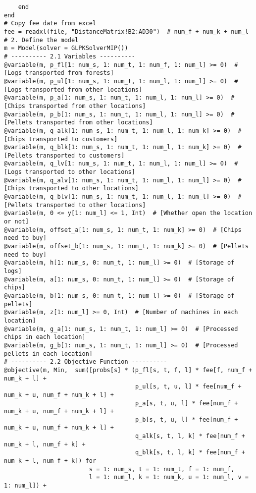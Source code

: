 \documentclass[fleqn,10pt]{wlscirep}
\begin{document}
\begin{lstlisting}
    end
end
# Copy fee date from excel
fee = readxl(file, "DistanceMatrix!B2:AD30")  # num_f + num_k + num_l
# 2. Define the model
m = Model(solver = GLPKSolverMIP())
# ---------- 2.1 Variables ----------
@variable(m, p_fl[1: num_s, 1: num_t, 1: num_f, 1: num_l] >= 0)  # [Logs transported from forests]
@variable(m, p_ul[1: num_s, 1: num_t, 1: num_l, 1: num_l] >= 0)  # [Logs transported from other locations]
@variable(m, p_a[1: num_s, 1: num_t, 1: num_l, 1: num_l] >= 0)  # [Chips transported from other locations]
@variable(m, p_b[1: num_s, 1: num_t, 1: num_l, 1: num_l] >= 0)  # [Pellets transported from other locations]
@variable(m, q_alk[1: num_s, 1: num_t, 1: num_l, 1: num_k] >= 0)  # [Chips transported to customers]
@variable(m, q_blk[1: num_s, 1: num_t, 1: num_l, 1: num_k] >= 0)  # [Pellets transported to customers]
@variable(m, q_lv[1: num_s, 1: num_t, 1: num_l, 1: num_l] >= 0)  # [Logs transported to other locations]
@variable(m, q_alv[1: num_s, 1: num_t, 1: num_l, 1: num_l] >= 0)  # [Chips transported to other locations]
@variable(m, q_blv[1: num_s, 1: num_t, 1: num_l, 1: num_l] >= 0)  # [Pellets transported to other locations]
@variable(m, 0 <= y[1: num_l] <= 1, Int)  # [Whether open the location or not]
@variable(m, offset_a[1: num_s, 1: num_t, 1: num_k] >= 0)  # [Chips need to buy]
@variable(m, offset_b[1: num_s, 1: num_t, 1: num_k] >= 0)  # [Pellets need to buy]
@variable(m, h[1: num_s, 0: num_t, 1: num_l] >= 0)  # [Storage of logs]
@variable(m, a[1: num_s, 0: num_t, 1: num_l] >= 0)  # [Storage of chips]
@variable(m, b[1: num_s, 0: num_t, 1: num_l] >= 0)  # [Storage of pellets]
@variable(m, z[1: num_l] >= 0, Int)  # [Number of machines in each location]
@variable(m, g_a[1: num_s, 1: num_t, 1: num_l] >= 0)  # [Processed chips in each location]
@variable(m, g_b[1: num_s, 1: num_t, 1: num_l] >= 0)  # [Processed pellets in each location]
# ---------- 2.2 Objective Function ----------
@objective(m, Min,  sum([probs[s] * (p_fl[s, t, f, l] * fee[f, num_f + num_k + l] +
                                     p_ul[s, t, u, l] * fee[num_f + num_k + u, num_f + num_k + l] +
                                     p_a[s, t, u, l] * fee[num_f + num_k + u, num_f + num_k + l] +
                                     p_b[s, t, u, l] * fee[num_f + num_k + u, num_f + num_k + l] +
                                     q_alk[s, t, l, k] * fee[num_f + num_k + l, num_f + k] +
                                     q_blk[s, t, l, k] * fee[num_f + num_k + l, num_f + k]) for
                        s = 1: num_s, t = 1: num_t, f = 1: num_f,
                        l = 1: num_l, k = 1: num_k, u = 1: num_l, v = 1: num_l]) +

\end{lstlisting}
\end{document}
